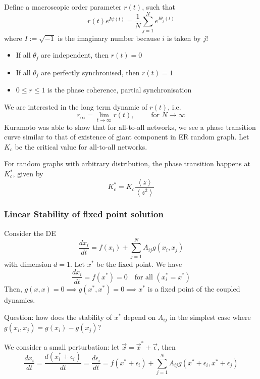\documentclass[12pt]{article}
\theoremstyle{definition}
\newcommand{\ip}[1]{\left\langle{#1}\right\rangle}
\begin{document}
Define a macroscopic order parameter $r(t)$, such that
\[
r(t)e^{I\psi(t)}=\frac1N\sum_{j=1}^Ne^{I\theta_j(t)}
\]
where $I:=\sqrt{-1}$ is the imaginary number because $i$ is taken by $j$!
\begin{itemize}
    \item If all $\theta_j$ are independent, then $r(t)=0$
    \item If all $\theta_j$ are perfectly synchronised, then $r(t) =1$
    \item $0\leq r\leq 1$ is the phase coherence, partial synchronisation
\end{itemize}
We are interested in the long term dynamic of $r(t)$, i.e.
\[
    r_\infty = \lim_{t\to\infty} r(t), \qquad \text{ for } N\to\infty
\]
Kuramoto was able to show that for all-to-all networks, we see a phase transition curve similar to that of existence of giant component in ER random graph. Let $K_c$ be the critical value for all-to-all networks.

For random graphs with arbitrary distribution, the phase transition happens at $K_c^*$, given by 
\[
K_c^* = K_c\frac{\ip{z}}{\ip{z^2}}
\]

\subsubsection{Linear Stability of fixed point solution}

Consider the DE
\[
\frac{dx_i}{dt}=f(x_i)+\sum_{j=1}^NA_{ij}g(x_i,x_j)
\]
with dimension $d=1$. Let $x^*$ be the fixed point. We have
\[
\frac{dx_i}{dt}=f(x^*)=0\quad\text{for all }(x_i^*=x^*)
\]
Then, $g(x,x)=0\implies g(x^*,x^*)=0\implies x^*$ is a fixed point of the coupled dynamics. 

Question: how does the stability of $x^*$ depend on $A_{ij}$ in the simplest case where $g(x_i,x_j)=g(x_i)-g(x_j)$? 

We consider a small perturbation: let $\vec{x} = \vec{x}^* + \vec{\epsilon}$, then 
\[
  \frac{d{x_i}}{dt}=\frac{d(x_i^*+\epsilon_i)}{dt}=\frac{d\epsilon_i}{dt}=f(x^*+\epsilon_i)+\sum_{j=1}^NA_{ij}g(x^*+\epsilon_i,x^*+\epsilon_j)  
\]
\end{document}

